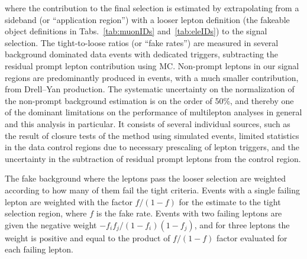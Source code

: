 where the contribution to the final selection is estimated by extrapolating from a sideband (or ``application region'') with a looser lepton definition (the fakeable object definitions in Tabs.~\ref{tab:muonIDs} and~\ref{tab:eleIDs}) to the signal selection. The tight-to-loose ratios (or ``fake rates'') are measured in several background dominated data events with dedicated triggers, subtracting the residual prompt lepton contribution using MC. Non-prompt leptons in our signal regions are predominantly produced in \ttbar events, with a much smaller contribution, from Drell--Yan production. The systematic uncertainty on the normalization of the non-prompt background estimation is on the order of 50\%, and thereby one of the dominant limitations on the performance of multilepton analyses in general and this analysis in particular. It consists of several individual sources, such as the result of closure tests of the method using simulated events, limited statistics in the data control regions due to necessary prescaling of lepton triggers, and the uncertainty in the subtraction of residual prompt leptons from the control region.

The fake background where the leptons pass the looser selection are weighted according to how many of them fail the tight criteria. Events with a single failing lepton are weighted with the factor $f/(1-f)$ for the estimate to the tight selection region, where $f$ is the fake rate. Events with two failing leptons are given the negative weight $-f_{i}f_{j}/(1-f_{i})(1-f_{j})$, and for three leptons the weight is positive and equal to the product of $f/(1-f)$ factor evaluated for each failing lepton.


